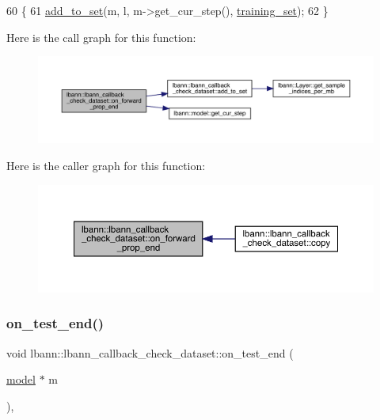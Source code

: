 \begin{DoxyCode}
60                                                                          \{
61   \hyperlink{classlbann_1_1lbann__callback__check__dataset_a17aff74d9926e07bfa1f090ad39bb4b6}{add\_to\_set}(m, l, m->get\_cur\_step(), \hyperlink{classlbann_1_1lbann__callback__check__dataset_a22d16efa2ec47759766f2f7478b11059}{training\_set});
62 \}
\end{DoxyCode}
Here is the call graph for this function\+:\nopagebreak
\begin{figure}[H]
\begin{center}
\leavevmode
\includegraphics[width=350pt]{classlbann_1_1lbann__callback__check__dataset_acedc222fc108c156d089f1baa8c040af_cgraph}
\end{center}
\end{figure}
Here is the caller graph for this function\+:\nopagebreak
\begin{figure}[H]
\begin{center}
\leavevmode
\includegraphics[width=350pt]{classlbann_1_1lbann__callback__check__dataset_acedc222fc108c156d089f1baa8c040af_icgraph}
\end{center}
\end{figure}
\mbox{\label{classlbann_1_1lbann__callback__check__dataset_afe1fda5a6bfe632dc680230cc56dff3e}} 
\subsubsection{\texorpdfstring{on\+\_\+test\+\_\+end()}{on\_test\_end()}}
{\footnotesize\ttfamily void lbann\+::lbann\+\_\+callback\+\_\+check\+\_\+dataset\+::on\+\_\+test\+\_\+end (\begin{DoxyParamCaption}\item[{\hyperlink{classlbann_1_1model}{model} $\ast$}]{m }\end{DoxyParamCaption})\hspace{0.3cm}{\ttfamily [override]}, {\ttfamily [virtual]}}

